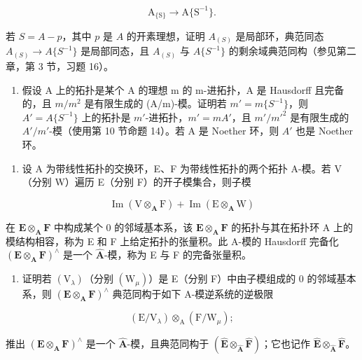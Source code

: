 \[
\mathrm{A} _ {\{\mathrm{S} \}} \rightarrow \mathrm{A} \{\mathrm{S} ^ {- 1} \}.
\]

 若 \(S = A - p\)，其中 \(p\) 是 \(A\) 的开素理想，证明 \(A_{(S)}\) 是局部环，典范同态 \(A_{(S)} \to A\{S^{-1}\}\) 是局部同态，且 \(A_{(S)}\) 与 \(A\{S^{-1}\}\) 的剩余域典范同构（参见第二章，第 3 节，习题 16）。~

\begin{enumerate}
\def\labelenumi{(\alph{enumi})}
\setcounter{enumi}{7}
\tightlist
\item
   假设 A 上的拓扑是某个 A 的理想 m 的 m-进拓扑，A 是 Hausdorff 且完备的，且 \(m/m^{2}\) 是有限生成的 (A/m)-模。证明若 \(m' = m\{S^{-1}\}\)，则 \(A' = A\{S^{-1}\}\) 上的拓扑是 \(m'\)-进拓扑，\(m' = mA'\)，且 \(m'/m'^{2}\) 是有限生成的 \(A'/m'\)-模（使用第 10 节命题 14）。若 A 是 Noether 环，则 \(A'\) 也是 Noether 环。
\end{enumerate}

\begin{enumerate}
\def\labelenumi{\arabic{enumi}.}
\setcounter{enumi}{27}
\tightlist
\item
  设 A 为带线性拓扑的交换环，E、F 为带线性拓扑的两个拓扑 A-模。若 V（分别 W）遍历 E（分别 F）的开子模集合，则子模
\end{enumerate}

\[
\operatorname{Im} (\mathrm{V} \otimes_ {\mathbf {A}} \mathrm{F}) + \operatorname{Im} (\mathrm{E} \otimes_ {\mathbf {A}} \mathrm{W})
\]

在 \(\mathbf{E} \otimes_{\mathbf{A}} \mathbf{F}\) 中构成某个 0 的邻域基本系，该 \(\mathbf{E} \otimes_{\mathbf{A}} \mathbf{F}\) 的拓扑与其在拓扑环 A 上的模结构相容，称为 E 和 F 上给定拓扑的张量积。此 A-模的 Hausdorff 完备化 \((\mathbf{E} \otimes_{\mathbf{A}} \mathbf{F})^{\wedge}\) 是一个 \(\hat{\mathbf{A}}\)-模，称为 E 与 F 的完备张量积。

\begin{enumerate}
\def\labelenumi{(\alph{enumi})}
\tightlist
\item
  证明若 \((\mathrm{V}_{\lambda})\)（分别 \((\mathrm{W}_{\mu})\)）是 E（分别 F）中由子模组成的 0 的邻域基本系，则 \((\mathbf{E} \otimes_{\mathbf{A}} \mathbf{F})^{\wedge}\) 典范同构于如下 A-模逆系统的逆极限
\end{enumerate}

\[
\left(\mathrm{E} / \mathrm{V} _ {\lambda}\right) \otimes_ {\mathrm{A}} \left(\mathrm{F} / \mathrm{W} _ {\mu}\right);
\]

推出 \((\mathbf{E} \otimes_{\mathbf{A}} \mathbf{F})^{\wedge}\) 是一个 \(\hat{\mathbf{A}}\)-模，且典范同构于 \((\hat{\mathbf{E}} \otimes_{\hat{\mathbf{A}}} \hat{\mathbf{F}})\)；它也记作 \(\hat{\mathbf{E}} \widehat{\otimes}_{\hat{\mathbf{A}}} \hat{\mathbf{F}}\)。


